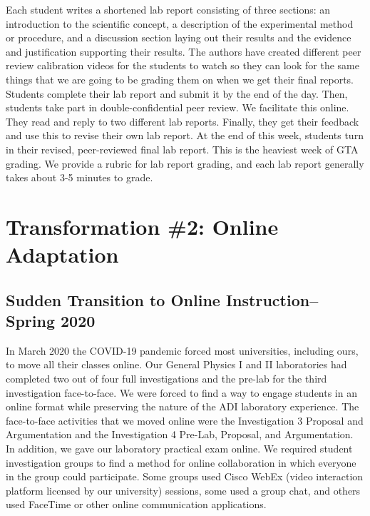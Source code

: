 \documentclass[aip, numerical, preprint]{revtex4-2}
\begin{document}
Each student writes a shortened lab report consisting of three sections: an introduction to the
scientific concept, a description of the experimental method or procedure, and a discussion
section laying out their results and the evidence and justification supporting their results. 
The authors have created different peer review calibration videos for the students to watch so
they can look for the same things that we are going to be grading them on when we get
their final reports.  Students complete their lab report and submit it by the end of the day.
Then, students take part in double-confidential peer review.  We facilitate this online.  They
read and reply to two different lab reports.  Finally, they get their feedback and use this to
revise their own lab report.  At the end of this week, students turn in their revised,
peer-reviewed final lab report.  This is the heaviest week of GTA grading.  We provide a rubric
for lab report grading, and each lab report generally takes about 3-5 minutes to grade.

\section{Transformation \#2: Online Adaptation}

\subsection{Sudden Transition to Online Instruction--Spring 2020}

In March 2020 the COVID-19 pandemic forced most universities, including ours, to move all their classes online. Our General Physics I and II laboratories had
completed two out of four full investigations and the pre-lab for the third investigation
face-to-face. We were forced to find a way to engage students in an online format while
preserving the nature of the ADI laboratory experience. The face-to-face activities that we
moved online were the Investigation 3 Proposal and Argumentation and the Investigation 4
Pre-Lab, Proposal, and Argumentation. In addition, we gave our laboratory practical exam
online. We required student investigation groups to find a method for online collaboration in
which everyone in the group could participate. Some groups used Cisco WebEx (video interaction
platform licensed by our university) sessions, some used a group chat, and others used FaceTime
or other online communication applications.
\end{document}
